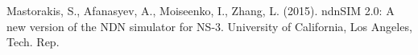 \documentclass[10pt,conference]{./IEEEtran}
\begin{document}
\begin{thebibliography}{10}
Mastorakis, S., Afanasyev, A., Moiseenko, I., Zhang, L. (2015). ndnSIM 2.0: A new version of the NDN simulator for NS-3. University of California, Los Angeles, Tech. Rep.











\end{thebibliography}
  
\end{document}

